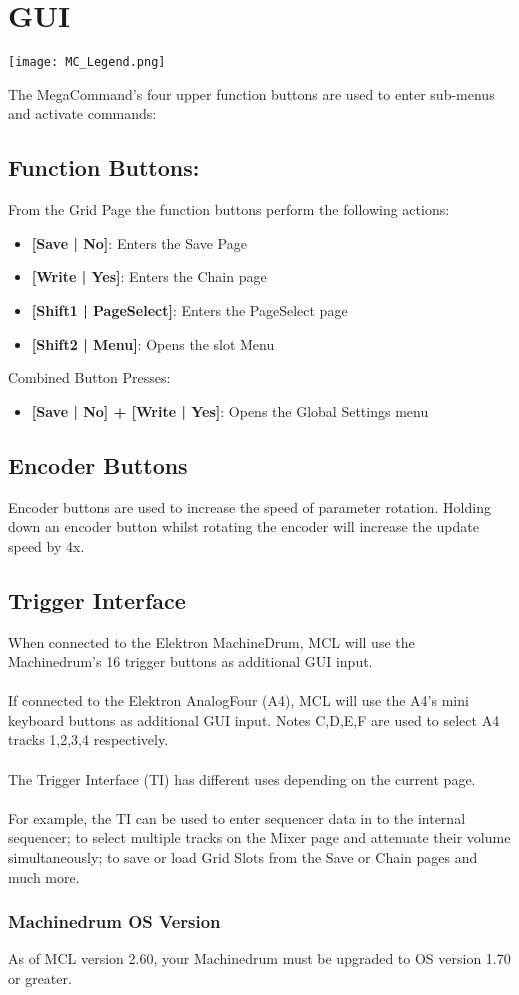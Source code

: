 \chapter{GUI}

\begin{center}
  \texttt{[image: MC\_Legend.png]}
\end{center}

The MegaCommand's four upper function buttons are used to enter sub-menus and activate commands:
\section{Function Buttons:}
From the Grid Page the function buttons perform the following actions:
\begin{itemize}
\item{\textbf{[Save | No]}: Enters the Save Page}
\item{\textbf{[Write | Yes]}: Enters the Chain page}
\item{\textbf{[Shift1 | PageSelect]}: Enters the PageSelect page}
\item{\textbf{[Shift2 | Menu]}: Opens the slot Menu }
\end{itemize}
Combined Button Presses:
\begin{itemize}
\item{\textbf{[Save | No] + [Write | Yes]}: Opens the Global Settings menu }
\end{itemize}

\section{Encoder Buttons}
Encoder buttons are used to increase the speed of parameter rotation.
Holding down an encoder button whilst rotating the encoder will increase the update speed by 4x.

\section{Trigger Interface}
When connected to the Elektron MachineDrum, MCL will use the Machinedrum's 16 trigger buttons as additional GUI input. \\
\\
If connected to the Elektron AnalogFour (A4), MCL will use the A4's mini keyboard buttons as additional GUI input. Notes C,D,E,F are used to select A4 tracks 1,2,3,4 respectively.\\
\\
The Trigger Interface (TI) has different uses depending on the current page.\\
\\For example, the TI can be used to enter sequencer data in to the internal sequencer;
to select multiple tracks on the Mixer page and attenuate their volume simultaneously; to save or load Grid Slots from the Save or Chain pages and much more.

\subsection{Machinedrum OS Version}
As of MCL version 2.60, your Machinedrum must be upgraded to OS version 1.70 or greater.

